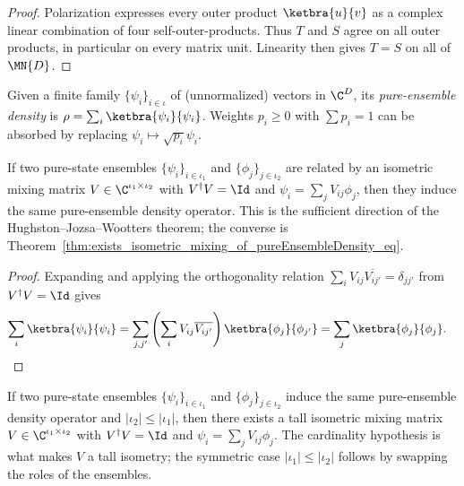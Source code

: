 \begin{proof}\leanok
    Polarization expresses every outer product $\ketbra{u}{v}$ as a
    complex linear combination of four self-outer-products. Thus $T$
    and $S$ agree on all outer products, in particular on every matrix
    unit. Linearity then gives $T=S$ on all of $\MN{D}$.
\end{proof}

\begin{definition}
    \label{def:pureEnsembleDensity}
    \leanok
    Given a finite family $\{\psi_i\}_{i \in \iota}$ of (unnormalized)
    vectors in $\C^D$, its \emph{pure-ensemble density} is
    $\rho = \sum_i \ketbra{\psi_i}{\psi_i}$. Weights
    $p_i \geq 0$ with $\sum p_i = 1$ can be absorbed by replacing
    $\psi_i \mapsto \sqrt{p_i} \psi_i$.
\end{definition}

\begin{theorem}
    \label{thm:pureEnsembleDensity_eq_of_isometric_mixing}
    \leanok
    If two pure-state ensembles $\{\psi_i\}_{i \in \iota_1}$ and
    $\{\phi_j\}_{j \in \iota_2}$ are related by an isometric mixing
    matrix $V \in \C^{\iota_1 \times \iota_2}$ with
    $V^\dagger V = \Id$ and $\psi_i = \sum_j V_{ij} \phi_j$, then
    they induce the same pure-ensemble density operator. This is the
    sufficient direction of the Hughston--Jozsa--Wootters theorem; the
    converse is Theorem~\ref{thm:exists_isometric_mixing_of_pureEnsembleDensity_eq}.
\end{theorem}

\begin{proof}
    \leanok
    Expanding and applying the orthogonality relation
    $\sum_i V_{ij}\overline{V_{ij'}} = \delta_{j j'}$ from
    $V^\dagger V = \Id$ gives
    \begin{align}
        \sum_i \ketbra{\psi_i}{\psi_i}
        &= \sum_{j, j'} \left(\sum_i V_{ij} \overline{V_{ij'}}\right)
        \ketbra{\phi_j}{\phi_{j'}}
        = \sum_j \ketbra{\phi_j}{\phi_j}.
        \notag
    \end{align}
\end{proof}

\begin{theorem}
    \label{thm:exists_isometric_mixing_of_pureEnsembleDensity_eq}
    \leanok
    If two pure-state ensembles $\{\psi_i\}_{i \in \iota_1}$ and
    $\{\phi_j\}_{j \in \iota_2}$ induce the same pure-ensemble density
    operator and $|\iota_2| \le |\iota_1|$, then there exists a tall
    isometric mixing matrix
    $V \in \C^{\iota_1 \times \iota_2}$ with
    $V^\dagger V = \Id$ and $\psi_i = \sum_j V_{ij} \phi_j$. The
    cardinality hypothesis is what makes $V$ a tall isometry; the
    symmetric case $|\iota_1| \le |\iota_2|$ follows by swapping the
    roles of the ensembles.
\end{theorem}

